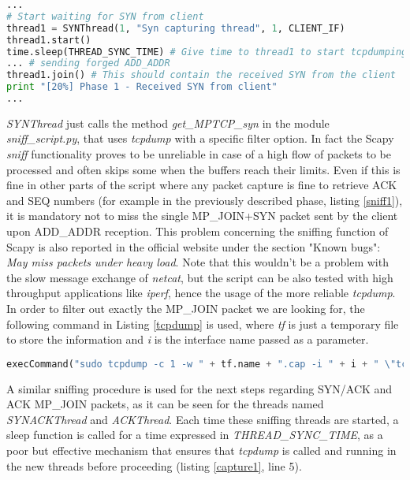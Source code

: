 \begin{lstlisting}[language=python, caption=\textit{Multiple threads are used to capture the answer from the UMLs}, label=capture1]
...
# Start waiting for SYN from client
thread1 = SYNThread(1, "Syn capturing thread", 1, CLIENT_IF)
thread1.start()
time.sleep(THREAD_SYNC_TIME) # Give time to thread1 to start tcpdumping
... # sending forged ADD_ADDR
thread1.join() # This should contain the received SYN from the client
print "[20%] Phase 1 - Received SYN from client"
...
\end{lstlisting}

\textit{SYNThread} just calls the method \textit{get\_MPTCP\_syn} in the module \textit{sniff\_script.py}, that uses \textit{tcpdump} with a specific filter option. In fact the Scapy \textit{sniff} functionality proves to be unreliable in case of a high flow of packets to be processed and often skips some when the buffers reach their limits. Even if this is fine in other parts of the script where any packet capture is fine to retrieve ACK and SEQ numbers (for example in the previously described phase, listing \ref{sniff1}), it is mandatory not to miss the single MP\_JOIN+SYN packet sent by the client upon ADD\_ADDR reception. This problem concerning the sniffing function of Scapy is also reported in the official website under the section "Known bugs": \textit{May miss packets under heavy load}.
Note that this wouldn't be a problem with the slow message exchange of \textit{netcat}, but the script can be also tested with high throughput applications like \textit{iperf}, hence the usage of the more reliable \textit{tcpdump}.
In order to filter out exactly the MP\_JOIN packet we are looking for, the following command in Listing \ref{tcpdump} is used, where \textit{tf} is just a temporary file to store the information and \textit{i} is the interface name passed as a parameter.

\begin{lstlisting}[language=python, caption=\textit{tcpdump for MP\_JOIN}, label=tcpdump]
execCommand("sudo tcpdump -c 1 -w " + tf.name + ".cap -i " + i + " \"tcp[tcpflags] & tcp-syn != 0\" 2>/dev/null", shell = True)
\end{lstlisting}

A similar sniffing procedure is used for the next steps regarding SYN/ACK and ACK MP\_JOIN packets, as it can be seen for the threads named \textit{SYNACKThread} and \textit{ACKThread}. Each time these sniffing threads are started, a sleep function is called for a time expressed in \textit{THREAD\_SYNC\_TIME}, as a poor but effective mechanism that ensures that \textit{tcpdump} is called and running in the new threads before proceeding (listing \ref{capture1}, line 5).

